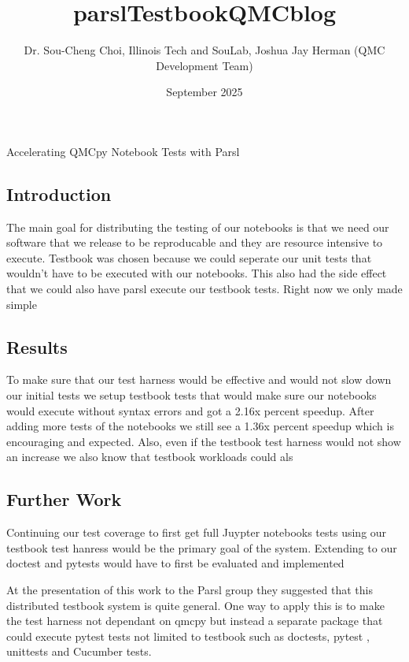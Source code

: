 \title{parslTestbookQMCblog}
\author{Dr. Sou-Cheng Choi, Illinois Tech and  SouLab, Joshua Jay Herman (QMC Development Team)}
\date{September 2025}

\maketitle
Accelerating QMCpy Notebook Tests with Parsl
\subsection{Introduction}

The main goal for distributing the testing of our notebooks is that we need our software that we release to be reproducable and they are resource intensive to execute. Testbook was chosen because we could seperate our unit tests that wouldn't have to be executed with our notebooks. This also had the side effect that we could also have parsl execute our testbook tests. Right now we only made simple 

\subsection{Results}
To make sure that our test harness would be effective and would not slow down our initial tests we setup testbook tests that would make sure our notebooks would execute without syntax errors and got a 2.16x percent speedup. After adding more tests of the notebooks we still see a 1.36x percent speedup which is encouraging and expected. Also, even if the testbook test harness would not show an increase we also know that testbook workloads could als 

\subsection{Further Work}

Continuing our test coverage to first get full Juypter notebooks tests using our testbook test hanress would be the primary goal of the system. Extending to our doctest and pytests would have to first be evaluated and implemented 

At the presentation of this work to the Parsl group they suggested that this distributed testbook system is quite general. One way to apply this is to make the test harness not dependant on qmcpy but instead a separate package that could execute pytest tests not limited to testbook such as doctests, pytest , unittests and Cucumber tests.
